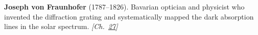 \textbf{Joseph von Fraunhofer} (1787–1826). Bavarian optician and physicist who invented the diffraction grating and systematically mapped the dark absorption lines in the solar spectrum. \emph{[Ch.~\hyperref[ch:planetaryskycolors]{27}]}

